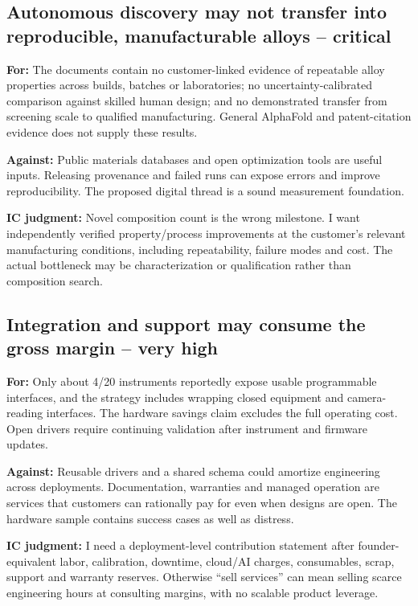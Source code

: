 \documentclass{article}
\begin{document}
\subsection{Autonomous discovery may not transfer into reproducible,
manufacturable alloys --
critical}\label{autonomous-discovery-may-not-transfer-into-reproducible-manufacturable-alloys-critical}

\textbf{For:} The documents contain no customer-linked evidence of
repeatable alloy properties across builds, batches or laboratories; no
uncertainty-calibrated comparison against skilled human design; and no
demonstrated transfer from screening scale to qualified manufacturing.
General AlphaFold and patent-citation evidence does not supply these
results. \citep{InputBrief,Bryan2021,InputProposal}

\textbf{Against:} Public materials databases and open optimization tools
are useful inputs. Releasing provenance and failed runs can expose
errors and improve reproducibility. The proposed digital thread is a
sound measurement foundation.

\textbf{IC judgment:} Novel composition count is the wrong milestone. I
want independently verified property/process improvements at the
customer's relevant manufacturing conditions, including repeatability,
failure modes and cost. The actual bottleneck may be characterization or
qualification rather than composition search.

\subsection{Integration and support may consume the gross margin -- very
high}\label{integration-and-support-may-consume-the-gross-margin-very-high}

\textbf{For:} Only about 4/20 instruments reportedly expose usable
programmable interfaces, and the strategy includes wrapping closed
equipment and camera-reading interfaces. The hardware savings claim
excludes the full operating cost. Open drivers require continuing
validation after instrument and firmware updates.
\citep{InputRecommendations,Pearce2020}

\textbf{Against:} Reusable drivers and a shared schema could amortize
engineering across deployments. Documentation, warranties and managed
operation are services that customers can rationally pay for even when
designs are open. The hardware sample contains success cases as well as
distress.

\textbf{IC judgment:} I need a deployment-level contribution statement
after founder-equivalent labor, calibration, downtime, cloud/AI charges,
consumables, scrap, support and warranty reserves. Otherwise ``sell
services'' can mean selling scarce engineering hours at consulting
margins, with no scalable product leverage.
\end{document}
